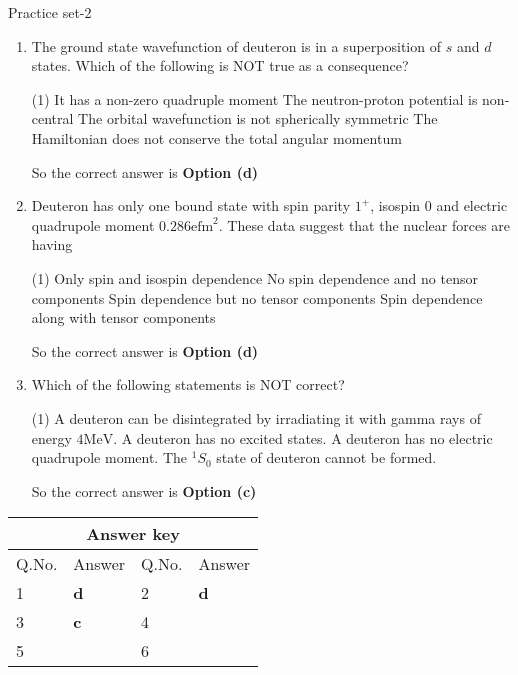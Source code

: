 \newpage
\begin{abox}
	Practice set-2
\end{abox}
\begin{enumerate}
	\item The ground state wavefunction of deuteron is in a superposition of $s$ and $d$ states. Which of the following is NOT true as a consequence?
	{}
	\begin{tasks}(1)
		\task[\textbf{A.}] It has a non-zero quadruple moment 
		\task[\textbf{B.}]The neutron-proton potential is non-central
		\task[\textbf{C.}] The orbital wavefunction is not spherically symmetric
		\task[\textbf{D.}]The Hamiltonian does not conserve the total angular momentum
	\end{tasks}
	\begin{answer}
		So the correct answer is \textbf{Option (d)}
	\end{answer}
	\item Deuteron has only one bound state with spin parity $1^{+}$, isospin 0 and electric quadrupole moment $0.286 \mathrm{efm}^{2}$. These data suggest that the nuclear forces are having
	{}
	\begin{tasks}(1)
		\task[\textbf{A.}] Only spin and isospin dependence
		\task[\textbf{B.}] No spin dependence and no tensor components
		\task[\textbf{C.}]Spin dependence but no tensor components
		\task[\textbf{D.}]Spin dependence along with tensor components
	\end{tasks}
	\begin{answer}
		So the correct answer is \textbf{Option (d)}
	\end{answer}
	\item Which of the following statements is NOT correct?
	{}
	\begin{tasks}(1)
		\task[\textbf{A.}] A deuteron can be disintegrated by irradiating it with gamma rays of energy $4 \mathrm{MeV}$.
		\task[\textbf{B.}] A deuteron has no excited states.
		\task[\textbf{C.}] A deuteron has no electric quadrupole moment.
		\task[\textbf{D.}] The ${ }^{1} S_{0}$ state of deuteron cannot be formed.
	\end{tasks}	
	\begin{answer}
		So the correct answer is \textbf{Option (c)}
	\end{answer}
\end{enumerate}
\setlength\arrayrulewidth{1pt}
\begin{table}[H]
	\centering
	\begin{tabular}{|p{1.5cm}|p{1.5cm}||p{1.5cm}|p{1.5cm}|}
		\hline
		\multicolumn{4}{|c|}{\textbf{Answer key}}\\\hline\hline
		\rowcolor{ocrel}Q.No.&Answer&Q.No.&Answer\\\hline
		1&\textbf{d} &2&\textbf{d}\\\hline 
		3&\textbf{c} &4&\textbf{} \\\hline
		5&\textbf{} &6&\textbf{} \\\hline
		
	\end{tabular}
\end{table}